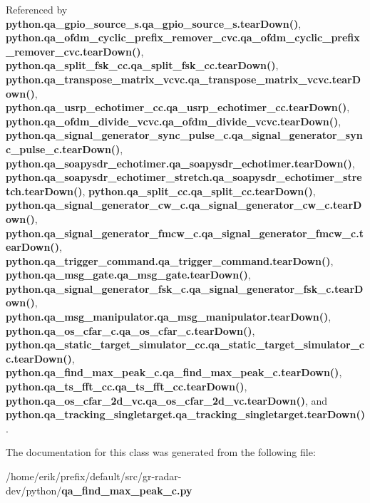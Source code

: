 Referenced by {\bf python.\+qa\+\_\+gpio\+\_\+source\+\_\+s.\+qa\+\_\+gpio\+\_\+source\+\_\+s.\+tear\+Down()}, {\bf python.\+qa\+\_\+ofdm\+\_\+cyclic\+\_\+prefix\+\_\+remover\+\_\+cvc.\+qa\+\_\+ofdm\+\_\+cyclic\+\_\+prefix\+\_\+remover\+\_\+cvc.\+tear\+Down()}, {\bf python.\+qa\+\_\+split\+\_\+fsk\+\_\+cc.\+qa\+\_\+split\+\_\+fsk\+\_\+cc.\+tear\+Down()}, {\bf python.\+qa\+\_\+transpose\+\_\+matrix\+\_\+vcvc.\+qa\+\_\+transpose\+\_\+matrix\+\_\+vcvc.\+tear\+Down()}, {\bf python.\+qa\+\_\+usrp\+\_\+echotimer\+\_\+cc.\+qa\+\_\+usrp\+\_\+echotimer\+\_\+cc.\+tear\+Down()}, {\bf python.\+qa\+\_\+ofdm\+\_\+divide\+\_\+vcvc.\+qa\+\_\+ofdm\+\_\+divide\+\_\+vcvc.\+tear\+Down()}, {\bf python.\+qa\+\_\+signal\+\_\+generator\+\_\+sync\+\_\+pulse\+\_\+c.\+qa\+\_\+signal\+\_\+generator\+\_\+sync\+\_\+pulse\+\_\+c.\+tear\+Down()}, {\bf python.\+qa\+\_\+soapysdr\+\_\+echotimer.\+qa\+\_\+soapysdr\+\_\+echotimer.\+tear\+Down()}, {\bf python.\+qa\+\_\+soapysdr\+\_\+echotimer\+\_\+stretch.\+qa\+\_\+soapysdr\+\_\+echotimer\+\_\+stretch.\+tear\+Down()}, {\bf python.\+qa\+\_\+split\+\_\+cc.\+qa\+\_\+split\+\_\+cc.\+tear\+Down()}, {\bf python.\+qa\+\_\+signal\+\_\+generator\+\_\+cw\+\_\+c.\+qa\+\_\+signal\+\_\+generator\+\_\+cw\+\_\+c.\+tear\+Down()}, {\bf python.\+qa\+\_\+signal\+\_\+generator\+\_\+fmcw\+\_\+c.\+qa\+\_\+signal\+\_\+generator\+\_\+fmcw\+\_\+c.\+tear\+Down()}, {\bf python.\+qa\+\_\+trigger\+\_\+command.\+qa\+\_\+trigger\+\_\+command.\+tear\+Down()}, {\bf python.\+qa\+\_\+msg\+\_\+gate.\+qa\+\_\+msg\+\_\+gate.\+tear\+Down()}, {\bf python.\+qa\+\_\+signal\+\_\+generator\+\_\+fsk\+\_\+c.\+qa\+\_\+signal\+\_\+generator\+\_\+fsk\+\_\+c.\+tear\+Down()}, {\bf python.\+qa\+\_\+msg\+\_\+manipulator.\+qa\+\_\+msg\+\_\+manipulator.\+tear\+Down()}, {\bf python.\+qa\+\_\+os\+\_\+cfar\+\_\+c.\+qa\+\_\+os\+\_\+cfar\+\_\+c.\+tear\+Down()}, {\bf python.\+qa\+\_\+static\+\_\+target\+\_\+simulator\+\_\+cc.\+qa\+\_\+static\+\_\+target\+\_\+simulator\+\_\+cc.\+tear\+Down()}, {\bf python.\+qa\+\_\+find\+\_\+max\+\_\+peak\+\_\+c.\+qa\+\_\+find\+\_\+max\+\_\+peak\+\_\+c.\+tear\+Down()}, {\bf python.\+qa\+\_\+ts\+\_\+fft\+\_\+cc.\+qa\+\_\+ts\+\_\+fft\+\_\+cc.\+tear\+Down()}, {\bf python.\+qa\+\_\+os\+\_\+cfar\+\_\+2d\+\_\+vc.\+qa\+\_\+os\+\_\+cfar\+\_\+2d\+\_\+vc.\+tear\+Down()}, and {\bf python.\+qa\+\_\+tracking\+\_\+singletarget.\+qa\+\_\+tracking\+\_\+singletarget.\+tear\+Down()}.



The documentation for this class was generated from the following file\+:\begin{DoxyCompactItemize}
\item 
/home/erik/prefix/default/src/gr-\/radar-\/dev/python/{\bf qa\+\_\+find\+\_\+max\+\_\+peak\+\_\+c.\+py}\end{DoxyCompactItemize}
